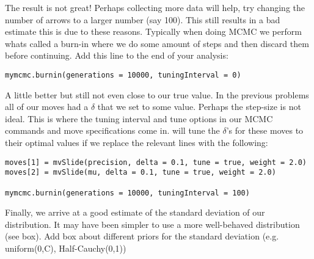 \begin{figure}[h!]
\label{fig:InvGammaCurves}
\end{figure}

The result is not great! Perhaps collecting more data will help, try changing the number of arrows to a larger number (say 100). This still results in a bad estimate this is due to these reasons. Typically when doing MCMC we perform whats called a burn-in where we do some amount of steps and then discard them before continuing. Add this line to the end of your analysis:

{\tt \begin{snugshade*}
 \begin{lstlisting}
mymcmc.burnin(generations = 10000, tuningInterval = 0)
 \end{lstlisting}
\end{snugshade*}}

A little better but still not even close to our true value. In the previous problems all of our moves had a $\delta$ that we set to some value. Perhaps the step-size is not ideal. This is where the tuning interval and tune options in our MCMC commands  and move specifications come in. \RevBayes will tune the $\delta$'s for these moves to their optimal values if we replace the relevant lines with the following:

{\tt \begin{snugshade*}
 \begin{lstlisting}
moves[1] = mvSlide(precision, delta = 0.1, tune = true, weight = 2.0)
moves[2] = mvSlide(mu, delta = 0.1, tune = true, weight = 2.0)
 
mymcmc.burnin(generations = 10000, tuningInterval = 100)
 \end{lstlisting}
\end{snugshade*}}

Finally, we arrive at a good estimate of the standard deviation of our distribution. It may have been simpler to use a more well-behaved distribution (see box). Add box about different priors for the standard deviation (e.g. uniform(0,C), Half-Cauchy(0,1))

